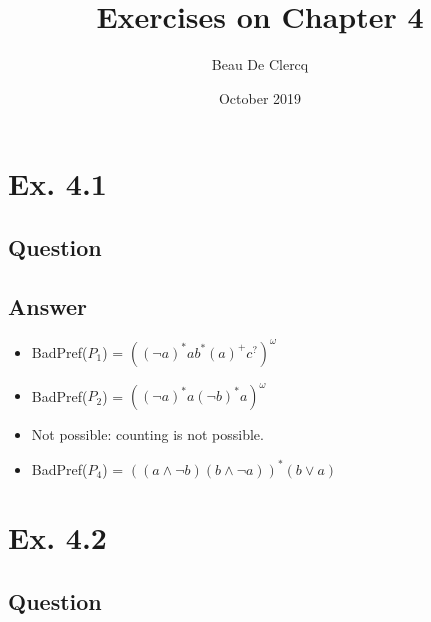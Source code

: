\documentclass[12pt]{article}
\title{Exercises on Chapter 4}
\author{Beau De Clercq}
\date{October 2019}
\begin{document}
\maketitle{}


\clearpage
\newpage

\section*{Ex. 4.1}
\subsection*{Question}

\subsection*{Answer}
\begin{itemize}
	\item BadPref($P_1$) = $((\neg a)^*ab^*(a)^+c^?)^\omega$
	\item BadPref($P_2$) = $((\neg a)^*a(\neg b)^*a)^\omega$
	\item Not possible: counting is not possible.
	\item BadPref($P_4$) = $((a\wedge \neg b)(b\wedge \neg a))^*(b\vee a)$
\end{itemize}

\newpage
\section*{Ex. 4.2}
\subsection*{Question}
\end{document}
